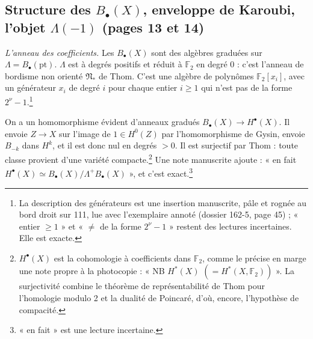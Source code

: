 \documentclass[11pt,a4paper]{article}
\begin{document}
\subsection*{Structure des $B_\bullet(X)$, enveloppe de Karoubi, l'objet $\Lambda(-1)$ (pages 13 et 14)}

\emph{L'anneau des coefficients.} Les $B_\bullet(X)$ sont des algèbres graduées
sur $\Lambda = B_\bullet(\mathrm{pt})$. $\Lambda$ est à degrés positifs et
réduit à $\mathbb{F}_2$ en degré 0 : c'est l'anneau de bordisme non orienté
$\mathfrak{N}_*$ de Thom. C'est une algèbre de polynômes $\mathbb{F}_2[x_i]$,
avec un générateur $x_i$ de degré $i$ pour chaque entier $i \geq 1$ qui n'est
pas de la forme $2^{\nu} - 1$.\footnote{La description des générateurs est une
insertion manuscrite, pâle et rognée au bord droit sur 111, lue avec
l'exemplaire annoté (dossier 162-5, page 45) ; « entier $\geq 1$ » et « $\neq$
de la forme $2^{\nu} - 1$ » restent des lectures incertaines. Elle est
exacte.}

On a un homomorphisme évident d'anneaux gradués $B_\bullet(X) \to
H^{\bullet}(X)$. Il envoie $Z \to X$ sur l'image de $1 \in H^{0}(Z)$ par
l'homomorphisme de Gysin, envoie $B_{-k}$ dans $H^{k}$, et il est donc nul en
degrés $> 0$. Il est surjectif par Thom : toute classe provient d'une variété
compacte.\footnote{$H^{\bullet}(X)$ est la cohomologie à coefficients dans
$\mathbb{F}_2$, comme le précise en marge une note propre à la photocopie :
« NB $H^{*}(X)$ $(= H^{*}(X, \mathbb{F}_2))$ ». La surjectivité combine le
théorème de représentabilité de Thom pour l'homologie modulo 2 et la dualité
de Poincaré, d'où, encore, l'hypothèse de compacité.} Une note manuscrite
ajoute : « en fait $H^{\bullet}(X) \simeq B_\bullet(X)/\Lambda^{+}B_\bullet(X)$
», et c'est exact.\footnote{« en fait » est une lecture incertaine.}
\end{document}
